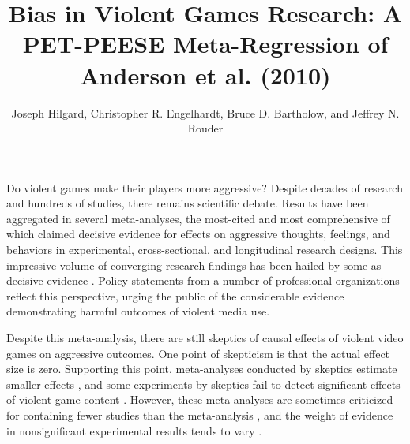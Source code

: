 \documentclass[man]{apa6}
\author{Joseph Hilgard, Christopher R. Engelhardt, Bruce D. Bartholow, and Jeffrey N. Rouder}
\title{Bias in Violent Games Research: A PET-PEESE Meta-Regression of Anderson et al. (2010)}
\affiliation{University of Missouri}
\begin{document}
\maketitle

Do violent games make their players more aggressive? Despite decades of research and hundreds of studies, there remains scientific debate. Results have been aggregated in several meta-analyses, the most-cited and most comprehensive of which \citep{Anderson:etal:2010} claimed decisive evidence for effects on aggressive thoughts, feelings, and behaviors in experimental, cross-sectional, and longitudinal research designs. 
This impressive volume of converging research findings has been hailed by some as decisive evidence \citep{Bushman:etal:2010,Huesmann:2010,Huesmann:2014}. 
Policy statements from a number of professional organizations \citep[e.g.,][]{AAP:2009} reflect this perspective, urging the public of the considerable evidence demonstrating harmful outcomes of violent media use.


Despite this meta-analysis, there are still skeptics of causal effects of violent video games on aggressive outcomes.
One point of skepticism is that the actual effect size is zero. Supporting this point, meta-analyses conducted by skeptics estimate smaller effects \citep{Ferguson:2007a,Ferguson:2007b,Ferguson:InPress,Sherry:2001}, %
and some experiments by skeptics fail to detect significant effects of violent game content \citep{Adachi:Willoughby:2011,Elson:etal:2013,Ferguson:etal:2008,Valadez:Ferguson:2012}. However, these meta-analyses are sometimes criticized for containing fewer studies than the \citet{Anderson:etal:2010} meta-analysis \citep[see, e.g., a response by ]{Bushman:XXXX}, and the weight of evidence in nonsignificant experimental results tends to vary \citep{Hilgard:etal:2014}.
\end{document}
